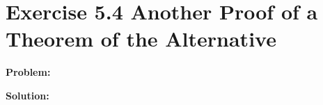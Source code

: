 \section{Exercise 5.4 Another Proof of a Theorem of the Alternative}
\textbf{Problem:} 

\textbf{Solution:}